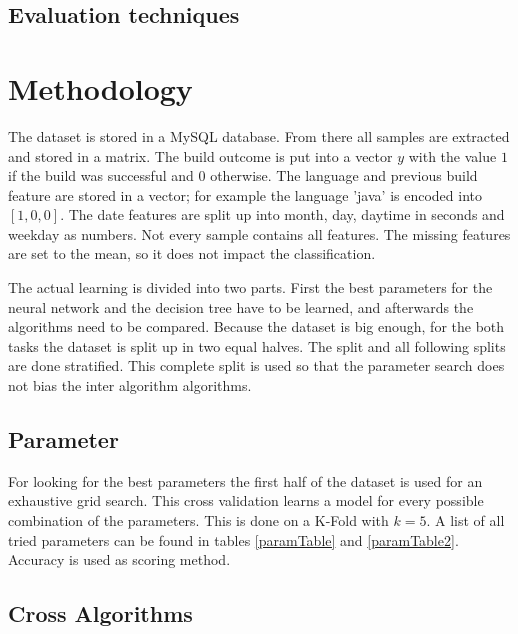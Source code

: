 \documentclass[a4paper,11pt]{article}
\begin{document}
\subsection{Evaluation techniques}


\section{Methodology}

The dataset is stored in a MySQL database. From there all samples are extracted and stored in a matrix. The build outcome is put into a vector $y$ with the value $1$ if the build was successful and $0$ otherwise. The language and previous build feature are stored in a vector; for example the language 'java' is encoded into $[1,0,0]$. The date features are split up into month, day, daytime in seconds and weekday as numbers. 
Not every sample contains all features. The missing features are set to the mean, so it does not impact the classification.

The actual learning is divided into two parts. First the best parameters for the neural network and the decision tree have to be learned, and afterwards the algorithms need to be compared. Because the dataset is big enough, for the both tasks the dataset is split up in two equal halves. The split and all following splits are done stratified. This complete split is used so that the parameter search does not bias the inter algorithm algorithms. 



\subsection{Parameter}

For looking for the best parameters the first half of the dataset is used for an exhaustive grid search. This cross validation learns a model for every possible combination of the parameters. This is done on a K-Fold with $k=5$. A list of all tried parameters can be found in tables \ref{paramTable} and \ref{paramTable2}. Accuracy is used as scoring method. 




\subsection{Cross Algorithms}
\end{document}
